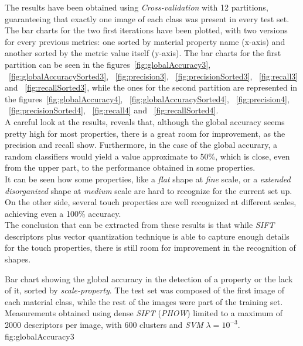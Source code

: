 The results have been obtained using \emph{Cross-validation} with 12 partitions, guaranteeing that exactly one image of each class was present in every test set. The bar charts for the two first iterations have been plotted, with two versions for every previous metrics: one sorted by material property name (x-axis) and another sorted by the metric value itself (y-axis). The bar charts for the first partition can be seen in the figures~\ref{fig:globalAccuracy3}, ~\ref{fig:globalAccuracySorted3}, ~\ref{fig:precision3}, ~\ref{fig:precisionSorted3}, ~\ref{fig:recall3} and ~\ref{fig:recallSorted3}, while the ones for the second partition are represented in the figures~\ref{fig:globalAccuracy4}, ~\ref{fig:globalAccuracySorted4}, ~\ref{fig:precision4}, ~\ref{fig:precisionSorted4}, ~\ref{fig:recall4} and ~\ref{fig:recallSorted4}. \\

A careful look at the results, reveals that, although the global accuracy seems pretty high for most properties, there is a great room for improvement, as the precision and recall show. Furthermore, in the case of the global accurary, a random classifiers would yield a value approximate to 50\%, which is close, even from the upper part, to the performance obtained in some properties. \\

It can be seen how some properties, like a \emph{flat} shape at \emph{fine} scale, or a \emph{extended disorganized} shape at \emph{medium} scale are hard to recognize for the current set up. On the other side, several touch properties are well recognized at different scales, achieving even a 100\% accuracy. \\

The conclusion that can be extracted from these results is that while \emph{SIFT} descriptors plus vector quantization technique is able to capture enough details for the touch properties, there is still room for improvement in the recognition of shapes.

{Bar chart showing the global accuracy in the detection of a property or the lack of it, sorted by \emph{scale-property}. The test set was composed of the first image of each material class, while the rest of the images were part of the training set. Measurements obtained using dense \emph{SIFT} (\emph{PHOW}) limited to a maximum of 2000 descriptors per image, with 600 clusters and \emph{SVM} $\lambda=10^{-3}$.}
{fig:globalAccuracy3}

